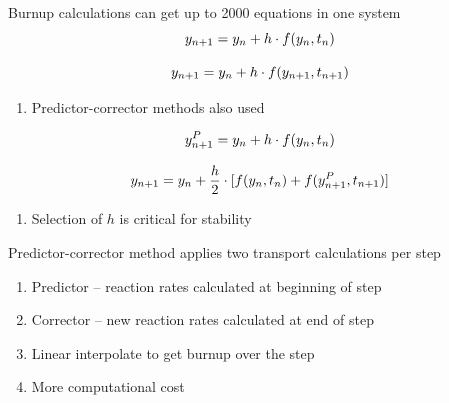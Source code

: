 \documentclass[aspectratio=1610,pdftex,dvipsnames,compress,xcolor={dvipsnames}]{beamer}
\begin{document}
\begin{frame}{Burnup calculations can get up to 2000 equations in one system}
    \begin{equation}
        \LARGE
        y_{n+1} = y_n+h \cdot f(y_n,t_n)
    \end{equation}

    \begin{equation}
        \LARGE
        y_{n + 1}=y_n + h\cdot f(y_{n + 1},t_{n + 1})
    \end{equation}

    \vspace*{\fill}

    \begin{enumerate}[series=outerlist,topsep=0pt,itemsep=7pt,leftmargin=*,label=(\arabic*)]
        \item[]Predictor-corrector methods also used
    \end{enumerate}

    \vspace*{\fill}

    \begin{equation}
        \LARGE
        y_{n+1}^P = y_n + h \cdot f(y_n,t_n)
    \end{equation}

    \begin{equation}
        \LARGE
        y_{n + 1}=y_n + \frac{h}{2} \cdot [f(y_n,t_n) + f(y_{n + 1}^P,t_{n + 1})]
    \end{equation}

    \vspace*{\fill}

    \begin{enumerate}[series=outerlist,topsep=0pt,itemsep=7pt,leftmargin=*,label=(\arabic*)]
        \item[]Selection of $h$ is critical for stability
    \end{enumerate}
\end{frame}


\begin{frame}{Predictor-corrector method applies two transport calculations per step}
    \begin{enumerate}[series=outerlist,topsep=0pt,itemsep=21pt,leftmargin=*,label=(\arabic*)]
        \item[]Predictor -- reaction rates calculated at beginning of step
        \item[]Corrector -- new reaction rates calculated at end of step
        \item[]Linear interpolate to get burnup over the step
        \item[]More computational cost
    \end{enumerate}
\end{frame}
\end{document}
